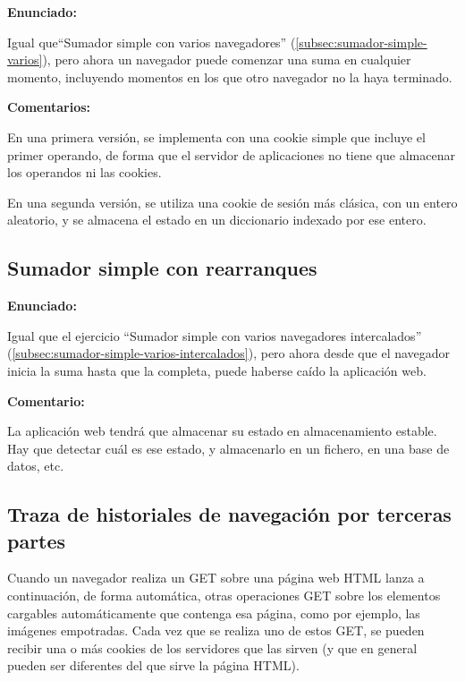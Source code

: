 \textbf{Enunciado:}

Igual que``Sumador simple con varios navegadores'' (\ref{subsec:sumador-simple-varios}), pero ahora un navegador puede comenzar una suma en cualquier momento, incluyendo momentos en los que otro navegador no la haya terminado.

\textbf{Comentarios:}

En una primera versión, se implementa con una cookie simple que incluye el primer operando, de forma que el servidor de aplicaciones no tiene que almacenar los operandos ni las cookies.

En una segunda versión, se utiliza una cookie de sesión más clásica, con un entero aleatorio, y se almacena el estado en un diccionario indexado por ese entero.

\subsection{Sumador simple con rearranques}
\label{subsec:sumador-simple-rearranques}

\textbf{Enunciado:}

Igual que el ejercicio ``Sumador simple con varios navegadores intercalados'' (\ref{subsec:sumador-simple-varios-intercalados}), pero ahora desde que el navegador inicia la suma hasta que la completa, puede haberse caído la aplicación web.

\textbf{Comentario:}

La aplicación web tendrá que  almacenar su estado en almacenamiento estable. Hay que detectar cuál es ese estado, y almacenarlo en  un fichero, en  una base de datos, etc.

\subsection{Traza de historiales de navegación por terceras partes}
\label{subsec:navegacion-terceras-partes}

Cuando un navegador realiza un GET sobre una página web HTML lanza a continuación, de forma automática, otras operaciones GET sobre los elementos cargables automáticamente que contenga esa página, como por ejemplo, las imágenes empotradas. Cada vez que se realiza uno de estos GET, se pueden recibir una o más cookies de los servidores que las sirven (y que en general pueden ser diferentes del que sirve la página HTML).

